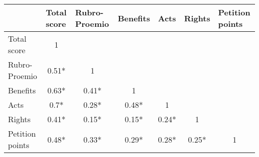 \begin{tabular}{l|cccccc}
\toprule
\multicolumn{1}{r}{} & \multicolumn{1}{l}{Total score} & \multicolumn{1}{l}{Rubro-Proemio} & \multicolumn{1}{l}{Benefits} & \multicolumn{1}{l}{Acts} & \multicolumn{1}{l}{Rights} & \multicolumn{1}{l}{Petition points} \\
\midrule
\midrule
Total score & 1     &       &       &       &       &  \\
Rubro-Proemio & 0.51* & 1     &       &       &       &  \\
Benefits & 0.63* & 0.41* & 1     &       &       &  \\
Acts  & 0.7*  & 0.28* & 0.48* & 1     &       &  \\
Rights & 0.41* & 0.15* & 0.15* & 0.24* & 1     &  \\
Petition points & 0.48* & 0.33* & 0.29* & 0.28* & 0.25* & 1 \\
\bottomrule
\bottomrule
\end{tabular}%
